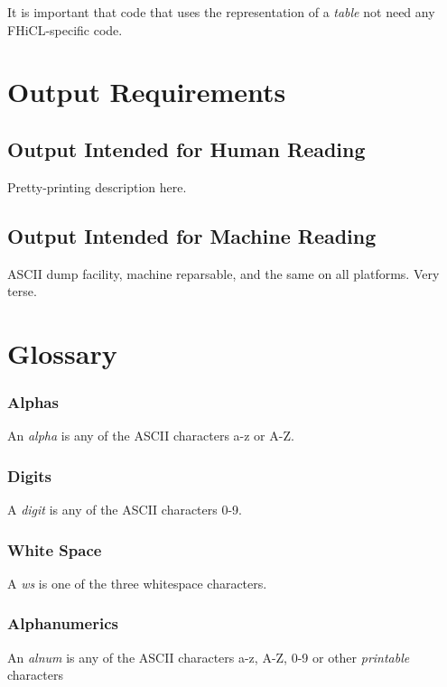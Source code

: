 \documentclass{article}
\begin{document}
		It is important that code that uses the representation of a
		\emph{table} not need any FHiCL-specific code.

\section{Output Requirements}

	\subsection{Output Intended for Human Reading}
  		Pretty-printing description here.
	\subsection{Output Intended for Machine Reading}
  		ASCII dump facility, machine reparsable, and the same on all
  		platforms. Very terse.

\section{Glossary}
		\subsubsection{Alphas}
			An \emph{alpha} is any of the ASCII characters a-z or A-Z.
		\subsubsection{Digits}
			A \emph{digit} is any of the ASCII characters 0-9.
		\subsubsection{White Space}
			A \emph{ws} is one of the three whitespace characters.
		\subsubsection{Alphanumerics}
			An \emph{alnum} is any of the ASCII characters a-z, A-Z, 0-9 or other \emph{printable} characters


\end{document}
